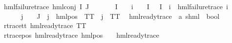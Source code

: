 \begin{isabellebody}
{\isachardoublequoteopen}hml{\isacharunderscore}{\kern0pt}failure{\isacharunderscore}{\kern0pt}trace\ {\isacharparenleft}{\kern0pt}hml{\isacharunderscore}{\kern0pt}conj\ I\ J\ {\isasymPhi}{\isacharparenright}{\kern0pt}{\isachardoublequoteclose}\ \isanewline
\ \ \ {\isachardoublequoteopen}{\isacharparenleft}{\kern0pt}{\isasymPhi}\ {\isacharbackquote}{\kern0pt}\ I{\isacharparenright}{\kern0pt}\ {\isacharequal}{\kern0pt}\ {\isacharbraceleft}{\kern0pt}{\isacharbraceright}{\kern0pt}\ {\isasymor}\ {\isacharparenleft}{\kern0pt}{\isasymexists}i\ {\isasymin}\ {\isasymPhi}\ {\isacharbackquote}{\kern0pt}\ I{\isachardot}{\kern0pt}\ {\isasymPhi}\ {\isacharbackquote}{\kern0pt}\ I\ {\isacharequal}{\kern0pt}\ {\isacharbraceleft}{\kern0pt}i{\isacharbraceright}{\kern0pt}\ {\isasymand}\ hml{\isacharunderscore}{\kern0pt}failure{\isacharunderscore}{\kern0pt}trace\ i{\isacharparenright}{\kern0pt}{\isachardoublequoteclose}\isanewline
\ \ \ \ \ {\isachardoublequoteopen}{\isasymforall}j\ {\isasymin}\ {\isasymPhi}\ {\isacharbackquote}{\kern0pt}\ J{\isachardot}{\kern0pt}\ {\isasymexists}{\isasymalpha}{\isachardot}{\kern0pt}\ j\ {\isacharequal}{\kern0pt}\ {\isacharparenleft}{\kern0pt}hml{\isacharunderscore}{\kern0pt}pos\ {\isasymalpha}\ TT{\isacharparenright}{\kern0pt}\ {\isasymor}\ j\ {\isacharequal}{\kern0pt}\ TT{\isachardoublequoteclose}\ \isanewline
\isanewline
{}\isamarkupfalse%
\ hml{\isacharunderscore}{\kern0pt}ready{\isacharunderscore}{\kern0pt}trace\ {\isacharcolon}{\kern0pt}{\isacharcolon}{\kern0pt}\ {\isachardoublequoteopen}{\isacharparenleft}{\kern0pt}{\isacharprime}{\kern0pt}a{\isacharcomma}{\kern0pt}\ {\isacharprime}{\kern0pt}s{\isacharparenright}{\kern0pt}hml\ {\isasymRightarrow}\ bool{\isachardoublequoteclose}\isanewline
\ \ \isanewline
r{\isacharunderscore}{\kern0pt}trace{\isacharunderscore}{\kern0pt}tt{\isacharcolon}{\kern0pt}\ {\isachardoublequoteopen}hml{\isacharunderscore}{\kern0pt}ready{\isacharunderscore}{\kern0pt}trace\ TT{\isachardoublequoteclose}\ {\isacharbar}{\kern0pt}\isanewline
r{\isacharunderscore}{\kern0pt}trace{\isacharunderscore}{\kern0pt}pos{\isacharcolon}{\kern0pt}\ {\isachardoublequoteopen}hml{\isacharunderscore}{\kern0pt}ready{\isacharunderscore}{\kern0pt}trace\ {\isacharparenleft}{\kern0pt}hml{\isacharunderscore}{\kern0pt}pos\ {\isasymalpha}\ {\isasymphi}{\isacharparenright}{\kern0pt}{\isachardoublequoteclose}\ \ {\isachardoublequoteopen}hml{\isacharunderscore}{\kern0pt}ready{\isacharunderscore}{\kern0pt}trace\ {\isasymphi}{\isachardoublequoteclose}{\isacharbar}{\kern0pt}\isanewline

\end{isabellebody}
